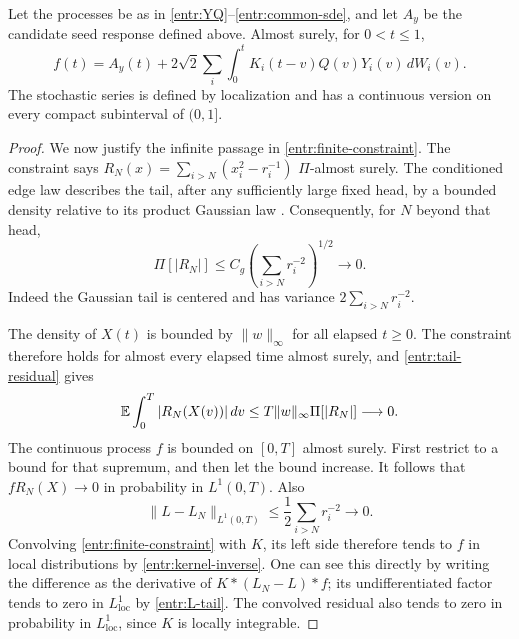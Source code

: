 \begin{lemma}\label{entr:volterra}
Let the processes be as in \eqref{entr:YQ}--\eqref{entr:common-sde},
and let \(A_y\) be the candidate seed response defined above.
Almost surely, for \(0<t\le1\),
\begin{equation}\label{entr:volterra-equation}
 f(t)=A_y(t)+2\sqrt2\sum_i\int_0^t
               K_i(t-v)Q(v)Y_i(v)\,dW_i(v).
\end{equation}
The stochastic series is defined by localization and has a continuous
version on every compact subinterval of \((0,1]\).
\end{lemma}

\begin{proof}
We now justify the infinite passage in \eqref{entr:finite-constraint}.
The constraint says \(R_N(x)=\sum_{i>N}(x_i^2-r_i^{-1})\)
\(\Pi\)-almost surely.  The conditioned edge law describes the tail,
after any sufficiently large fixed head, by a bounded density relative
to its product Gaussian law
\cite[Proposition~2.3]{FUA}.
Consequently, for \(N\) beyond that head,
\begin{equation}\label{entr:tail-residual}
 \Pi[|R_N|]\le C_g\left(\sum_{i>N}r_i^{-2}\right)^{1/2}
       \longrightarrow0.
\end{equation}
Indeed the Gaussian tail is centered and has variance
\(2\sum_{i>N}r_i^{-2}\).

The density of \(X(t)\) is bounded by \(\|w\|_\infty\) for all
elapsed \(t\ge0\).  The constraint therefore holds for almost every
elapsed time almost surely, and \eqref{entr:tail-residual} gives
\[
 \mathbb E\int_0^T|R_N(X(v))|\,dv
       \le T\|w\|_\infty\Pi[|R_N|]\longrightarrow0 .
\]
The continuous process \(f\) is bounded on \([0,T]\) almost surely.
First restrict to a bound for that supremum, and then let the bound
increase.  It follows that
\(fR_N(X)\to0\) in probability in \(L^1(0,T)\).
Also
\begin{equation}\label{entr:L-tail}
 \|L-L_N\|_{L^1(0,T)}
 \le\frac12\sum_{i>N}r_i^{-2}\longrightarrow0 .
\end{equation}
Convolving \eqref{entr:finite-constraint} with \(K\), its left side
therefore tends to \(f\) in local distributions by
\eqref{entr:kernel-inverse}.  One can see this directly by writing
the difference as the derivative of
\(K*(L_N-L)*f\); its undifferentiated factor tends to zero in
\(L^1_{\mathrm{loc}}\) by \eqref{entr:L-tail}.  The convolved residual
also tends to zero in probability in \(L^1_{\mathrm{loc}}\), since
\(K\) is locally integrable.


\end{proof}
